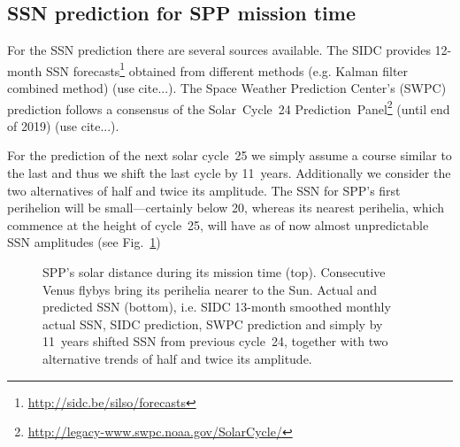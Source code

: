 \subsection{SSN prediction for SPP mission time}
For the SSN prediction there are several sources available. The SIDC provides 12-month SSN forecasts\footnote{\url{http://sidc.be/silso/forecasts}} obtained from different methods (e.g. Kalman filter combined method) (use cite...). The Space Weather Prediction Center's (SWPC) prediction follows a consensus of the Solar~Cycle~24 Prediction~Panel\footnote{\url{http://legacy-www.swpc.noaa.gov/SolarCycle/}} (until end of 2019) (use cite...).

For the prediction of the next solar cycle~25 we simply assume a course similar to the last and thus we shift the last cycle by 11~years. Additionally we consider the two alternatives of half and twice its amplitude. The SSN for SPP's first perihelion will be small---certainly below 20, whereas its nearest perihelia, which commence at the height of cycle~25, will have as of now almost unpredictable SSN amplitudes (see Fig.~\ref{fig:SPP_orbit_predicted_SSN_overview_d_plot})\\
\begin{figure}
	\caption{SPP's solar distance during its mission time (top). Consecutive Venus flybys bring its perihelia nearer to the Sun. Actual and predicted SSN (bottom), i.e. SIDC 13-month smoothed monthly actual SSN, SIDC prediction, SWPC prediction and simply by 11~years shifted SSN from previous cycle~24, together with two alternative trends of half and twice its amplitude.}
	\label{fig:SPP_orbit_predicted_SSN_overview_d_plot}
\end{figure}

